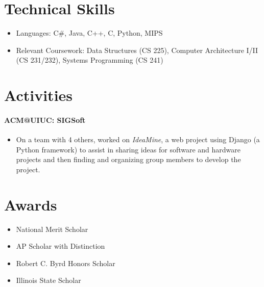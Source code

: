 \documentclass[letterpaper,12pt]{article}
\begin{document}
\section*{Technical Skills}
\begin{itemize}
\item Languages: C\#, Java, C++, C, Python, MIPS
\item Relevant Coursework: Data Structures (CS 225),
Computer Architecture I/II (CS 231/232), Systems Programming (CS 241)
\end{itemize}

\section*{Activities}
\paragraph{ACM@UIUC: SIGSoft}
\begin{itemize}
\item On a team with 4 others, worked on \emph{IdeaMine},
a web project using Django (a Python framework)
to assist in sharing ideas for software and hardware projects
and then finding and organizing group members to develop the project.
\end{itemize}

\section*{Awards}
\begin{multicols}{2}
\begin{itemize}
\item National Merit Scholar
\item AP Scholar with Distinction
\item Robert C. Byrd Honors Scholar
\item Illinois State Scholar
\end{itemize}
\end{multicols}
\end{document}
